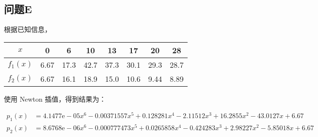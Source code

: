 \documentclass[lang=cn,a4paper,newtx,bibend=bibtex]{elegantpaper}
\begin{document}
\subsection{问题E}
  
根据已知信息，

\begin{center}
  \begin{tabular}{|c|c|c|c|c|c|c|c|}
    \hline
    $x$ & 0 & 6 & 10 & 13 & 17 & 20 & 28 \\
    \hline
    $f_1(x)$ & 6.67 & 17.3 & 42.7 & 37.3 & 30.1 & 29.3 & 28.7 \\
    \hline
    $f_2(x)$ & 6.67 & 16.1 & 18.9 & 15.0 & 10.6 & 9.44 & 8.89\\
    \hline
  \end{tabular}
  \end{center}

使用 Newton 插值，得到结果为：

\begin{equation*}
\begin{aligned}
p_1(x) &= 4.1477\mathrm{e}{-}05x^{6}-0.00371557x^{5}+0.128281x^{4}-2.11512x^{3}+16.2855x^{2}-43.0127x+6.67 \\
p_2(x) &= 8.6768\mathrm{e}{-}06x^{6}-0.000777473x^{5}+0.0265858x^{4}-0.424283x^{3}+2.98227x^{2}-5.85018x+6.67
\end{aligned}
\end{equation*}
\end{document}
